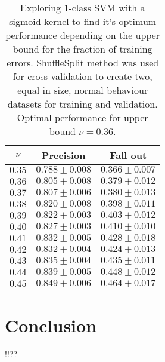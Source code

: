 \documentclass[reqno,openany,12pt]{amsbook}
\begin{document}
\begin{table}
\begin{tabular}{|c|c|c|}
\hline
$\nu$ &  Precision & Fall out \\ \hline 
$0.35$ &  $0.788 \pm 0.008$ & $0.366 \pm 0.007$ \\ \hline 
$0.36$ &  $0.805 \pm 0.008$ & $0.379 \pm 0.012$ \\ \hline 
$0.37$ &  $0.807 \pm 0.006$ & $0.380 \pm 0.013$ \\ \hline 
$0.38$ &  $0.820 \pm 0.008$ & $0.398 \pm 0.011$ \\ \hline 
$0.39$ &  $0.822 \pm 0.003$ & $0.403 \pm 0.012$ \\ \hline 
$0.40$ &  $0.827 \pm 0.003$ & $0.410 \pm 0.010$ \\ \hline 
$0.41$ &  $0.832 \pm 0.005$ & $0.428 \pm 0.018$ \\ \hline 
$0.42$ &  $0.832 \pm 0.004$ & $0.424 \pm 0.013$ \\ \hline 
$0.43$ &  $0.835 \pm 0.004$ & $0.435 \pm 0.011$ \\ \hline
$0.44$ &  $0.839 \pm 0.005$ & $0.448 \pm 0.012$ \\ \hline
$0.45$ &  $0.849 \pm 0.006$ & $0.464 \pm 0.017$ \\ \hline
\end{tabular}
\vspace{5pt}
\caption[Finding optimum 1-class SVM performance depending on bound for training errors]{Exploring 1-class SVM with a sigmoid kernel to find it's optimum performance depending on the upper bound for the fraction of training errors. ShuffleSplit method was used for cross validation to create two, equal in size, normal behaviour datasets for training and validation. Optimal performance for upper bound $\nu = 0.36$.}
\label{1csvmt4}
\end{table}


%

\chapter{Conclusion}


 !!?? 
 
\end{document}
